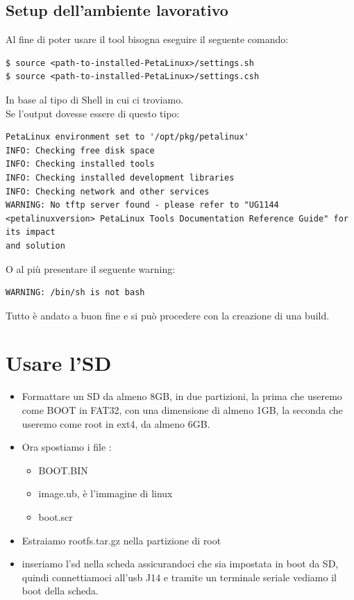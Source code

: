 \subsection{Setup dell'ambiente lavorativo}
\label{SetupPeta}
Al fine di poter usare il tool bisogna eseguire il seguente comando:
\begin{lstlisting}
$ source <path-to-installed-PetaLinux>/settings.sh
$ source <path-to-installed-PetaLinux>/settings.csh
\end{lstlisting}
In base al tipo di Shell in cui ci troviamo.\\
Se l'output dovesse essere di questo tipo:
\begin{lstlisting}
PetaLinux environment set to '/opt/pkg/petalinux'
INFO: Checking free disk space
INFO: Checking installed tools
INFO: Checking installed development libraries
INFO: Checking network and other services
WARNING: No tftp server found - please refer to "UG1144 <petalinuxversion> PetaLinux Tools Documentation Reference Guide" for its impact
and solution
\end{lstlisting}
O al più presentare il seguente warning:
\begin{lstlisting}
WARNING: /bin/sh is not bash
\end{lstlisting}
Tutto è andato a buon fine e si può procedere con la creazione di una build.



\section{Usare l'SD}
\label{sd}
\begin{itemize}
\item Formattare un SD da almeno 8GB, in due partizioni, la prima che useremo come BOOT in FAT32, con una dimensione di almeno 1GB, la seconda che useremo come root in ext4, da almeno 6GB.
\item Ora spostiamo i file :
\begin{itemize}
\item BOOT.BIN
\item image.ub, è l'immagine di linux
\item boot.scr
\end{itemize}
\item Estraiamo rootfs.tar.gz nella partizione di root
\item inseriamo l'sd nella scheda assicurandoci che sia impostata in boot da SD, quindi connettiamoci all'usb J14 e tramite un terminale seriale vediamo il boot della scheda.
\end{itemize}

